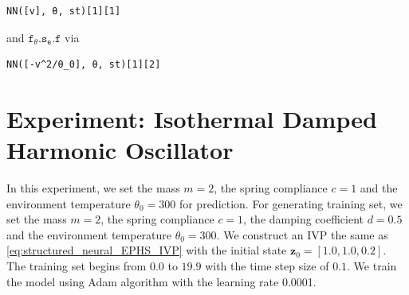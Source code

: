 \documentclass[
	parskip, 			   %
	twoside, 			   %
	DIV=14, 			   %
	BCOR=15.0mm, 		   %
	headsepline, 		   %
	open=right, 		   %
	captions=tableheading, %
	bibliography=totoc,    %
	numbers=noenddot       %
]{scrreprt}
\begin{document}
\begin{verbatim}
NN([v], θ, st)[1][1]
\end{verbatim}

and $\mathtt{f_{\theta}.s_{e}.f}$ via

\begin{verbatim}
NN([-v^2/θ_0], θ, st)[1][2]
\end{verbatim}


\clearpage
\section{Experiment: Isothermal Damped Harmonic Oscillator}
In this experiment, we set the mass $m=2$, the spring compliance $c=1$ and the environment temperature $\theta_{0}=300$ for prediction. For generating training set, we set the mass $m=2$, the spring compliance $c=1$, the damping coefficient $d=0.5$ and the environment temperature $\theta_{0}=300$. We construct an IVP the same as \ref{eq:structured_neural_EPHS_IVP} with the initial state $\mathbf{z}_{0} = [1.0, 1.0, 0.2]$. The training set begins from $0.0$ to $19.9$ with the time step size of $0.1$. We train the model using Adam algorithm with the learning rate 0.0001.
\end{document}
